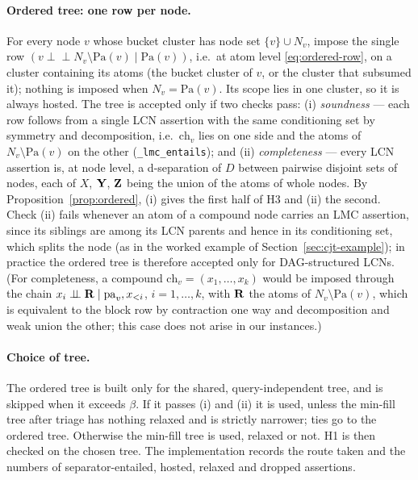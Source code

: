 \documentclass{article} %
\newcommand{\indep}{\perp\!\!\!\perp}
\newcommand{\ch}{\mathrm{ch}}
\newcommand{\pa}{\mathrm{pa}}
\providecommand{\Pa}{\mathrm{Pa}}
\begin{document}
\paragraph{Ordered tree: one row per node.}
For every node $v$ whose bucket cluster has node set $\{v\}\cup N_v$, impose the
single row $(v\indep N_v\setminus\Pa(v)\mid\Pa(v))$, i.e.\ at atom level
\eqref{eq:ordered-row}, on a cluster containing its atoms (the bucket cluster of
$v$, or the cluster that subsumed it); nothing is imposed when $N_v=\Pa(v)$. Its
scope lies in one cluster, so it is always hosted. The tree is accepted only if two
checks pass:
(i) \emph{soundness} --- each row follows from a single LCN assertion with the same
conditioning set by symmetry and decomposition, i.e.\ $\ch_v$ lies on one side and
the atoms of $N_v\setminus\Pa(v)$ on the other (\texttt{\_lmc\_entails}); and
(ii) \emph{completeness} --- every LCN assertion is, at node level, a d-separation
of $D$ between pairwise disjoint sets of nodes, each of $X$, $\mathbf{Y}$, $\mathbf{Z}$ being the
union of the atoms of whole nodes. By Proposition~\ref{prop:ordered}, (i) gives the
first half of H3 and (ii) the second. Check (ii) fails whenever an atom of a
compound node carries an LMC assertion, since its siblings are among its LCN
parents and hence in its conditioning set, which splits the node (as in the worked
example of Section~\ref{sec:cjt-example}); in practice the ordered tree is
therefore accepted only for DAG-structured LCNs. (For completeness, a compound
$\ch_v=(x_1,\dots,x_k)$ would be imposed through the chain
$x_i\indep \bR\mid\pa_v,x_{<i}$, $i=1,\dots,k$, with $\mathbf{R}$ the atoms of
$N_v\setminus\Pa(v)$, which is equivalent to the block row by contraction one way
and decomposition and weak union the other; this case does not arise in our
instances.)

\paragraph{Choice of tree.} The ordered tree is built only for the shared,
query-independent tree, and is skipped when it exceeds $\beta$. If it passes (i)
and (ii) it is used, unless the min-fill tree after triage has nothing relaxed and
is strictly narrower; ties go to the ordered tree. Otherwise the min-fill tree is
used, relaxed or not. H1 is then checked on the chosen tree. The implementation
records the route taken and the numbers of separator-entailed, hosted, relaxed and
dropped assertions.
\end{document}
